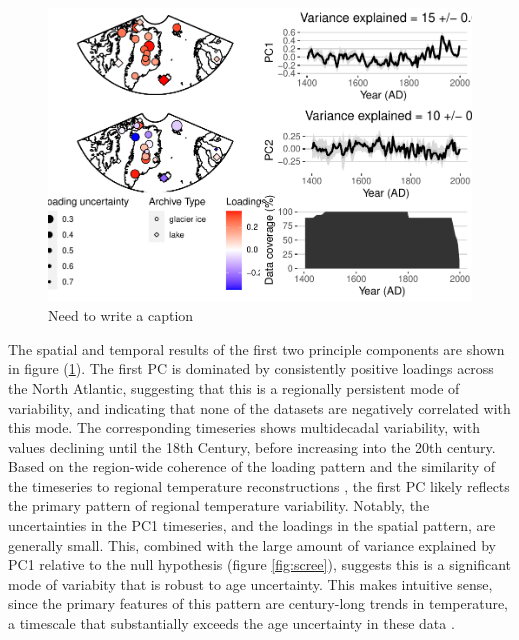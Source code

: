 \documentclass[gchron, manuscript]{copernicus}
\begin{document}
\begin{figure}
\includegraphics[width=12cm]{geoChronR-paper_files/figure-latex/pca-1} \caption{Need to write a caption}\label{fig:pca}
\end{figure}

The spatial and temporal results of the first two principle components are shown in figure (\ref{fig:pca}).
The first PC is dominated by consistently positive loadings across the North Atlantic, suggesting that this is a regionally persistent mode of variability, and indicating that none of the datasets are negatively correlated with this mode.
The corresponding timeseries shows multidecadal variability, with values declining until the 18th Century, before increasing into the 20th century.
Based on the region-wide coherence of the loading pattern and the similarity of the timeseries to regional temperature reconstructions \citep[\citet{McKayKaufman2014},\citet{wernerArcticCFR}]{paico}, the first PC likely reflects the primary pattern of regional temperature variability.
Notably, the uncertainties in the PC1 timeseries, and the loadings in the spatial pattern, are generally small.
This, combined with the large amount of variance explained by PC1 relative to the null hypothesis (figure \ref{fig:scree}), suggests this is a significant mode of variabity that is robust to age uncertainty.
This makes intuitive sense, since the primary features of this pattern are century-long trends in temperature, a timescale that substantially exceeds the age uncertainty in these data \citep{McKayKaufman2014}.
\end{document}
